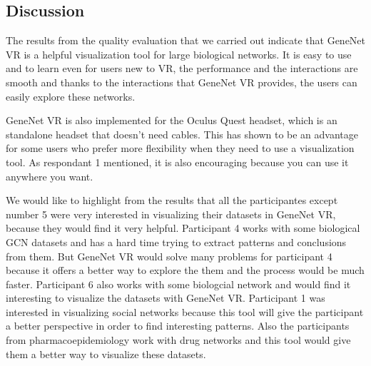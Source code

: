 \subsection{Discussion}
The results from the quality evaluation that we carried out indicate that GeneNet VR is a helpful visualization tool for large biological networks. It is easy to use and to learn even for users new to VR, the performance and the interactions are smooth and thanks to the interactions that GeneNet VR provides, the users can easily explore these networks.

GeneNet VR is also implemented for the Oculus Quest headset, which is an standalone headset that doesn't need cables. This has shown to be an advantage for some users who prefer more flexibility when they need to use a visualization tool. As respondant 1 mentioned, it is also encouraging because you can use it anywhere you want.

We would like to highlight from the results that all the participantes except number 5 were very interested in visualizing their datasets in GeneNet VR, because they would find it very helpful. Participant 4 works with some biological GCN datasets and has a hard time trying to extract patterns and conclusions from them. But GeneNet VR would solve many problems for participant 4 because it offers a better way to explore the them and the process would be much faster. Participant 6 also works with some biologcial network and would find it interesting to visualize the datasets with GeneNet VR. Participant 1 was interested in visualizing social networks because this tool will give the participant a better perspective in order to find interesting patterns. Also the participants from pharmacoepidemiology work with drug networks and this tool would give them a better way to visualize these datasets.


